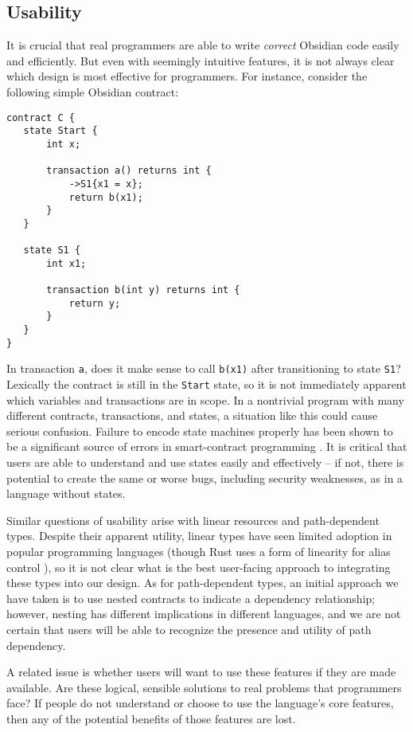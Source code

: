 \documentclass[sigplan,10pt,review]{acmart}\settopmatter{printfolios=true}
\begin{document}
\subsection{Usability}
It is crucial that real programmers are able to write \textit{correct} Obsidian 
code easily and efficiently. But even with seemingly intuitive features, it is not always clear 
which design is most effective for programmers. For instance, consider the following simple 
Obsidian contract:

\begin{lstlisting}
contract C {
   state Start {
       int x;
  
       transaction a() returns int {
           ->S1{x1 = x};
           return b(x1);
       }
   }
  
   state S1 {
       int x1;
      
       transaction b(int y) returns int {
           return y;
       }
   }
}
\end{lstlisting}

In transaction \texttt{\small{a}}, does it make sense to call \texttt{\small{b(x1)}} after transitioning 
to state \texttt{\small{S1}}? Lexically the contract is still in the 
\texttt{\small{Start}} state, so it is not immediately apparent which variables and transactions are in scope. 
In a nontrivial program with many different contracts, 
transactions, and states, a situation like this could cause serious confusion. Failure to encode state 
machines properly has been shown to be a significant source of errors in smart-contract 
programming \cite{Delmolino}. It is critical that users are able to understand and use states easily and 
effectively -- if not, there is potential to create the same or worse bugs, including security weaknesses, as in a 
language without states. 

Similar questions of usability arise with linear resources and path-dependent types. 
Despite their apparent utility, linear types have seen limited adoption in popular programming languages (though 
Rust uses a form of linearity for alias control \cite{Rust}), so it is not clear what is the best user-facing
approach to integrating these types into our design. As for path-dependent types, an initial approach we have 
taken is to use nested contracts to indicate a dependency relationship; however, nesting has different 
implications in different languages, and we are not certain that users will be able to recognize the 
presence and utility of path dependency. 

A related issue is whether users will want to use these features if they are made available. Are 
these logical, sensible solutions to real problems that programmers face? If people do not 
understand or choose to use the language's core features, then any of the potential benefits 
of those features are lost. 
\end{document}

